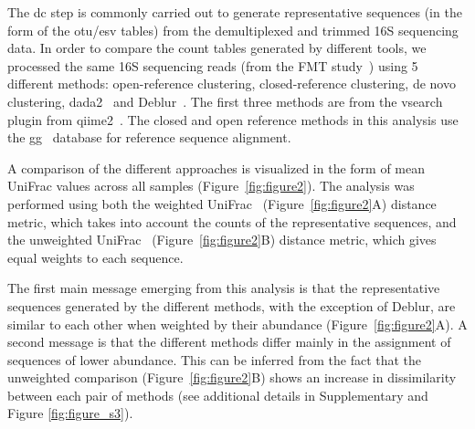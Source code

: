   The \ac{dc} step is commonly carried out to generate representative sequences (in the form of the \acs{otu}/\acs{esv} tables) from the demultiplexed and trimmed 16S sequencing data.
  In order to compare the count tables generated by different tools, we processed the same 16S sequencing reads (from the FMT study~\cite{Kang2017}) using 5 different methods: open-reference clustering, closed-reference clustering, de novo clustering, \ac{dada2}~\cite{Callahan2016} and Deblur~\cite{Amir2017}.
  The first three methods are from the vsearch plugin from \ac{qiime2}~\cite{bolyenReproducibleInteractiveScalable2019}.
  The closed and open reference methods in this analysis use the \ac{gg}~\cite{DeSantis2006} database for reference sequence alignment.

  A comparison of the different approaches is visualized in the form of mean UniFrac values across all samples (Figure~\ref{fig:figure2}).
  The analysis was performed using both the weighted UniFrac~\cite{Lozupone2007} (Figure~\ref{fig:figure2}A) distance metric, which takes into account the counts of the representative sequences, and the unweighted UniFrac~\cite{Lozupone2005} (Figure~\ref{fig:figure2}B) distance metric, which gives equal weights to each sequence.

  The first main message emerging from this analysis is that the representative sequences generated by the different methods, with the exception of Deblur, are similar to each other when weighted by their abundance (Figure~\ref{fig:figure2}A).
  A second message is that the different methods differ mainly in the assignment of sequences of lower abundance. This can be inferred from the fact that the unweighted comparison (Figure~\ref{fig:figure2}B) shows an increase in dissimilarity between each pair of methods (see additional details in Supplementary and Figure \ref{fig:figure_s3}).

